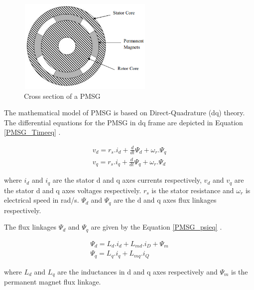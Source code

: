 \begin{figure}[]
\centering
    \includegraphics[height = 4.5cm,width = 6.5cm]{Diagrams/Chapter_2/PMSG.PNG}
    \caption{Cross section of a PMSG \cite{sebastian_transient_1989}}
    \label{fig:PMSG}
\end{figure}

The mathematical model of \gls{PMSG} is based on Direct-Quadrature (\gls{dq}) theory. The differential equations for the \gls{PMSG} in \gls{dq} frame are depicted in Equation \ref{PMSG_Timeeq} \cite{sebastian_transient_1989}.  

\begin{equation}\label{PMSG_Timeeq}
\begin{aligned}
    v_d = r_s . i_d + \frac{d}{dt} \Psi_d +\omega_r . \Psi_q \\
    v_q = r_s . i_q + \frac{d}{dt} \Psi_q +\omega_r . \Psi_d
\end{aligned}
\end{equation}

where $i_d$ and $i_q$ are the stator d and q axes currents respectively, $v_d$ and $v_q$ are the stator d and q axes voltages respectively. $r_s$ is the stator resistance and $\omega_r$ is electrical speed in rad/s. $\Psi_d$ and $\Psi_q$ are the d and q axes flux linkages respectively.

The flux linkages $\Psi_d$ and $\Psi_q$ are given by the Equation \ref{PMSG_psieq} \cite{rtds_tech}.

\begin{equation}\label{PMSG_psieq}
\begin{aligned}
    \Psi_d = L_d . i_d + L_{md} . i_D  + \Psi_m \\
    \Psi_q = L_q . i_q + L_{mq} . i_Q
\end{aligned}
\end{equation}

where $L_d$ and $L_q$ are the inductances in d and q axes respectively and $\Psi_m$ is the permanent magnet flux linkage.

